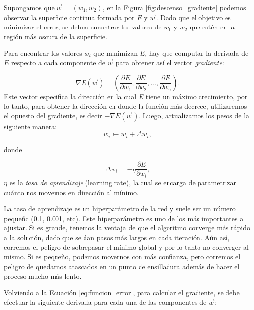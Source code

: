 \documentclass[spanish]{report}
\begin{document}
Supongamos que $\vec{w}^{\,} = (w_1, w_2)$, en la Figura \ref{fig:descenso_gradiente} podemos observar la superficie continua formada por $E$ y $\vec{w}^{\,}$. Dado que el objetivo es minimizar el error, se deben encontrar los valores de $w_1$ y $w_2$ que estén en la región más oscura de la superficie. 

Para encontrar los valores $w_i$ que minimizan $E$, hay que computar la derivada de $E$ respecto a cada componente de $\vec{w}^{\,}$ para obtener así el vector \textit{gradiente}:

\begin{equation}
\nabla E(\vec{w}^{\,}) = (\dfrac{\partial E}{\partial w_1}, \dfrac{\partial E}{\partial w_2}, ..., \dfrac{\partial E}{\partial w_n}).
\end{equation}
\newline
\noindent Este vector especifica la dirección en la cual $E$ tiene un máximo crecimiento, por lo tanto, para obtener la dirección en donde la función más decrece, utilizaremos el opuesto del gradiente, es decir $- \nabla E(\vec{w}^{\,})$. Luego, actualizamos los pesos de la siguiente manera:
\newpage
\begin{equation}
w_i \leftarrow w_i+ \Delta w_i,
\end{equation}

\noindent donde

\begin{equation}\label{eq:param_act}
\Delta w_i = - \eta \dfrac{\partial E}{\partial w_i},
\end{equation}
\newline
\noindent $\eta$ es la \textit{tasa de aprendizaje} (learning rate), la cual se encarga de parametrizar cuánto nos movemos en dirección al mínimo. 

La tasa de aprendizaje es un hiperparámetro de la red y suele ser un número pequeño (0.1, 0.001, etc). Este hiperparámetro es uno de los más importantes a ajustar. Si es grande, tenemos la ventaja de que el algoritmo converge más rápido a la solución, dado que se dan pasos más largos en cada iteración. Aún así, corremos el peligro de sobrepasar el mínimo global y por lo tanto no converger al mismo. Si es pequeño, podemos movernos con más confianza, pero corremos el peligro de quedarnos atascados en un punto de ensilladura además de hacer el proceso mucho más lento.
\newline

Volviendo a la Ecuación \ref{eq:funcion_error}, para calcular el gradiente, se debe efectuar la siguiente derivada para cada una de las componentes de $\vec{w}^{\,}$:
\end{document}
